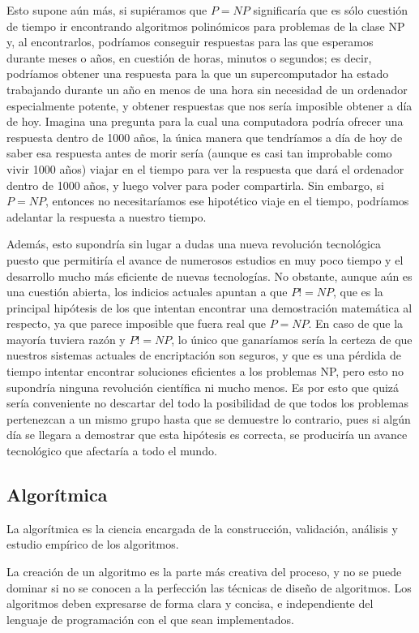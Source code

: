 \documentclass[a4paper, 11pt]{article}
\begin{document}
Esto supone aún más, si supiéramos que $P = NP$ significaría que es sólo cuestión de tiempo ir encontrando algoritmos polinómicos para problemas de la clase NP y, al encontrarlos, podríamos conseguir respuestas para las que esperamos durante meses o años, en cuestión de horas, minutos o segundos; es decir, podríamos obtener una respuesta para la que un supercomputador ha estado trabajando durante un año en menos de una hora sin necesidad de un ordenador especialmente potente, y obtener respuestas que nos sería imposible obtener a día de hoy. Imagina una pregunta para la cual una computadora podría ofrecer una respuesta dentro de 1000 años, la única manera que tendríamos a día de hoy de saber esa respuesta antes de morir sería (aunque es casi tan improbable como vivir 1000 años) viajar en el tiempo para ver la respuesta que dará el ordenador dentro de 1000 años, y luego volver para poder compartirla. Sin embargo, si $P = NP$, entonces no necesitaríamos ese hipotético viaje en el tiempo, podríamos adelantar la respuesta a nuestro tiempo.

Además, esto supondría sin lugar a dudas una nueva revolución tecnológica puesto que permitiría el avance de numerosos estudios en muy poco tiempo y el desarrollo mucho más eficiente de nuevas tecnologías. No obstante, aunque aún es una cuestión abierta, los indicios actuales apuntan a que $P != NP$, que es la principal hipótesis de los que intentan encontrar una demostración matemática al respecto, ya que parece imposible que fuera real que $P = NP$. En caso de que la mayoría tuviera razón y $P != NP$, lo único que ganaríamos sería la certeza de que nuestros sistemas actuales de encriptación son seguros, y que es una pérdida de tiempo intentar encontrar soluciones eficientes a los problemas NP, pero esto no supondría ninguna revolución científica ni mucho menos. Es por esto que quizá sería conveniente no descartar del todo la posibilidad de que todos los problemas pertenezcan a un mismo grupo hasta que se demuestre lo contrario, pues si algún día se llegara a demostrar que esta hipótesis es correcta, se produciría un avance tecnológico que afectaría a todo el mundo. 

\subsection{Algorítmica}
La algorítmica es la ciencia encargada de la construcción, validación, análisis y estudio empírico de los algoritmos.

La creación de un algoritmo es la parte más creativa del proceso, y no se puede dominar si no se conocen a la perfección las técnicas de diseño de algoritmos. Los algoritmos deben expresarse de forma clara y concisa, e independiente del lenguaje de programación con el que sean implementados. 
\end{document}
